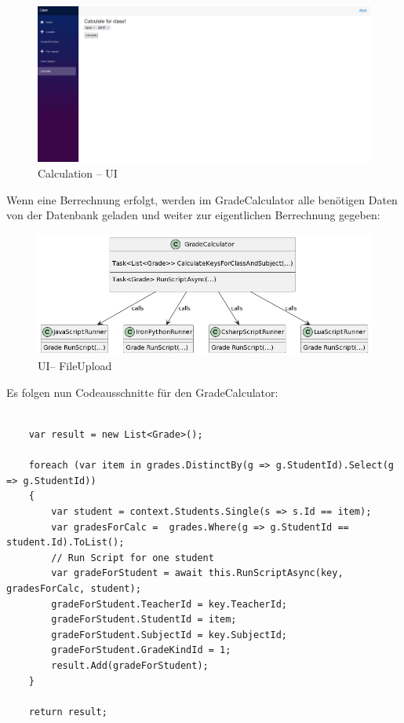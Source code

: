 \begin{figure}[H]
    \centering
    \includegraphics[scale=0.5]{pics/CalculationUI.png}
    \caption{Calculation -- UI}
    \label{fig:impl:CalculationUI}
\end{figure}

Wenn eine Berrechnung erfolgt, werden im GradeCalculator alle benötigen Daten von der Datenbank geladen und weiter zur eigentlichen Berrechnung gegeben:

\begin{figure}[H]
    \centering
    \includegraphics[scale=0.5]{pics/LogicClassDiagram.png}
    \caption{UI-- FileUpload}
    \label{fig:impl:Logic}
\end{figure}
\newpage
Es folgen nun Codeausschnitte für den GradeCalculator: 

\begin{lstlisting}[language={[Sharp]C}, caption=Code for loading data for Calculation, label=lst:imp:calc]
                 
    var result = new List<Grade>();

    foreach (var item in grades.DistinctBy(g => g.StudentId).Select(g => g.StudentId))
    {
        var student = context.Students.Single(s => s.Id == item);
        var gradesForCalc =  grades.Where(g => g.StudentId == student.Id).ToList();
        // Run Script for one student
        var gradeForStudent = await this.RunScriptAsync(key, gradesForCalc, student);
        gradeForStudent.TeacherId = key.TeacherId;
        gradeForStudent.StudentId = item;
        gradeForStudent.SubjectId = key.SubjectId;
        gradeForStudent.GradeKindId = 1;
        result.Add(gradeForStudent);
    }

    return result;

\end{lstlisting}

